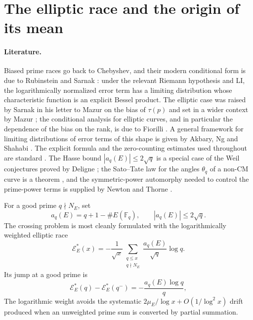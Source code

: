 \documentclass[11pt,reqno]{amsart}
\theoremstyle{remark}
\newcommand{\Fq}{\mathbb{F}}
\begin{document}
\section{The elliptic race and the origin of its mean}
\label{sec:race}

\paragraph{Literature.}
Biased prime races go back to Chebyshev, and their modern conditional form is due to Rubinstein and Sarnak \cite{RubinsteinSarnak1994}: under the relevant Riemann hypothesis and LI, the logarithmically normalized error term has a limiting distribution whose characteristic function is an explicit Bessel product.  The elliptic case was raised by Sarnak in his letter to Mazur on the bias of $\tau(p)$ \cite{Sarnak2007} and set in a wider context by Mazur \cite{Mazur2008}; the conditional analysis for elliptic curves, and in particular the dependence of the bias on the rank, is due to Fiorilli \cite{Fiorilli2014}.  A general framework for limiting distributions of error terms of this shape is given by Akbary, Ng and Shahabi \cite{ANS2014}.  The explicit formula and the zero-counting estimates used throughout are standard \cite{IwaniecKowalski2004}.  The Hasse bound $|a_q(E)|\le2\sqrt q$ is a special case of the Weil conjectures proved by Deligne \cite{Deligne1974}; the Sato--Tate law for the angles $\theta_q$ of a non-CM curve is a theorem \cite{BLGHT2011}, and the symmetric-power automorphy needed to control the prime-power terms is supplied by Newton and Thorne \cite{NewtonThorne2021I,NewtonThorne2021II}.

For a good prime $q\nmid N_E$, set
\begin{equation}
  a_q(E)=q+1-\#E(\Fq_q),
  \qquad |a_q(E)|\le 2\sqrt q.
\end{equation}
The crossing problem is most cleanly formulated with the logarithmically weighted elliptic race
\begin{equation}
  \mathcal E_E^{*}(x)
  =-\frac{1}{\sqrt x}
   \sum_{\substack{q\le x\\q\nmid N_E}}
   \frac{a_q(E)}{\sqrt q}\log q.
  \label{eq:race}
\end{equation}
Its jump at a good prime is
\begin{equation}
  \mathcal E_E^{*}(q)-\mathcal E_E^{*}(q^-)
  =-\frac{a_q(E)\log q}{q},
  \label{eq:race-jump}
\end{equation}
The logarithmic weight avoids the systematic $2\mu_E/\log x+O(1/\log^2x)$ drift produced when an unweighted prime sum is converted by partial summation.
\end{document}
